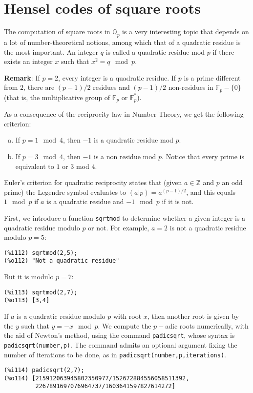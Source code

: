 \documentclass[fleqn]{cas-sc}
\begin{document}
\section{Hensel codes of square roots}\label{sec6}

\noindent The computation of square roots in $\mathbb{Q}_p$ is a very interesting
topic that depends on a lot of number-theoretical notions, among which that of a
quadratic residue is the most important.
An integer $q$ is called a quadratic residue mod $p$ if there exists an
integer $x$ such that  $x^2 =q \mod p$.

\noindent\textbf{Remark}: If $p=2$, every integer is a quadratic residue. 
If $p$ is a prime different from $2$, there are $(p-1)/2$ residues and 
$(p-1)/2$ non-residues in $\mathbb{F}_p-\{0\}$ (that is, the multiplicative
group of $\mathbb{F}_p$ or $\mathbb{F}^*_p$).

As a consequence of the reciprocity law in Number Theory, we get the following criterion:
\begin{enumerate}[(a)]\renewcommand{\theenumi}{\alph{enumi}}
	\item If $p=1 \mod 4$, then $-1$ is a quadratic residue mod $p$.
	\item If $p=3 \mod 4$, then $-1$ is a non residue mod $p$.
	Notice that every prime is equivalent to $1$ or $3$ mod $4$.
\end{enumerate}

Euler's criterion for quadratic reciprocity states that (given $a \in \mathbb{Z}$
and $p$ an odd prime) the Legendre symbol evaluates to $(a|p)=a^{(p-1)/2}$, 
and this equals $1\mod p$  if $a$ is a quadratic residue and $-1\mod p$ if it is not.

First, we introduce a function \texttt{sqrtmod} to determine whether a given integer
is a quadratic residue modulo $p$ or not. For example, $a=2$ is not a quadratic residue
modulo $p=5$:
\begin{verbatim}
(%i112)	sqrtmod(2,5);
(%o112)	"Not a quadratic residue"
\end{verbatim}
But it is modulo $p=7$:
\begin{verbatim}
(%i113)	sqrtmod(2,7);
(%o113)	[3,4]
\end{verbatim}

If $a$ is a quadratic residue modulo $p$ with root $x$, then another root is
given by the $y$ such that $y=-x \mod p$. We compute the $p-$adic roots numerically,
with the aid of Newton's method, using the command \texttt{padicsqrt}, whose syntax is
\texttt{padicsqrt(number,p)}. The command admits an optional argument fixing the number
of iterations to be done, as in \texttt{padicsqrt(number,p,iterations)}.
\begin{verbatim}
(%i114)	padicsqrt(2,7);
(%o114)	[215912063945802350977/152672884556058511392,
         2267891697076964737/1603641597827614272]
\end{verbatim}
\end{document}
